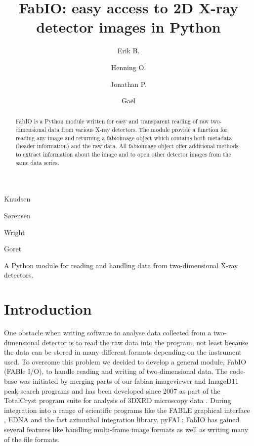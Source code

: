 \documentclass[preprint]{iucr}
\begin{document}
\title{FabIO: easy access to 2D X-ray detector images in Python}

    \author[a]{Erik B.}{Knudsen}
    \author[b]{Henning O.}{S{\o}rensen}
    \author[c]{Jonathan P.}{Wright}
    \author[c]{Ga\"el}{Goret}

\maketitle

\begin{synopsis}
A Python module for reading and handling data from two-dimensional X-ray detectors.
\end{synopsis}

\begin{abstract}
FabIO is a Python module written for easy and transparent reading 
of raw two-dimensional data from various X-ray detectors. The module provide a
function for reading any image and returning a fabioimage object which 
contains both metadata (header information) and the raw data.
All fabioimage object offer additional methods to extract
information about the image and to open other detector images from
the same data series.
 
\end{abstract}

\section{Introduction}

One obstacle when writing software to analyse data collected from a
two-dimensional detector is to read the raw data into the program,
not least because the data can be stored in many different formats
depending on the instrument used.
To overcome this problem we decided to develop a general module,
FabIO (FABle I/O), to handle reading and writing of two-dimensional
data.
The code-base was initiated by merging parts of our fabian imageviewer
\cite{fabian} and ImageD11 \cite{imaged11} peak-search programs and has
been developed since 2007 as part of the TotalCryst \cite{totalcryst}
program suite for analysis of 3DXRD microscopy data \cite{3dxrd}.
During integration into a range of scientific programs like the FABLE graphical
interface \cite{fable}, EDNA \cite{edna} and
the fast azimuthal integration library, pyFAI \cite{pyfai}; FabIO has gained
several features like handling multi-frame image formats as well as
writing many of the file formats.
\end{document}
